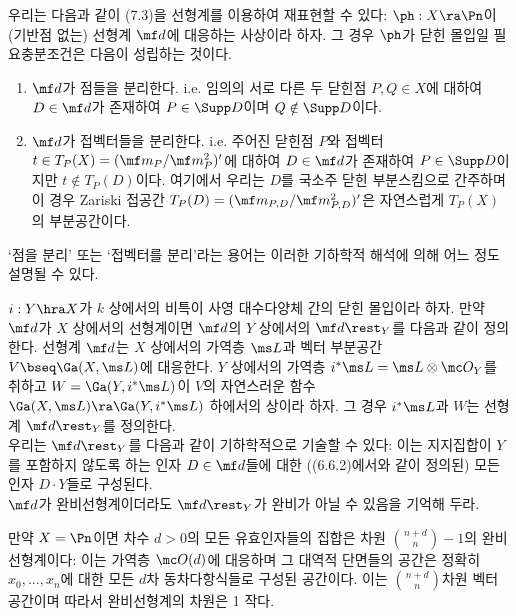 	
	\begin{remark}
	우리는 다음과 같이 (7.3)을 선형계를 이용하여 재표현할 수 있다:
	$\ph:X\ra\Pn$이 (기반점 없는) 선형계 $\mf d$에 대응하는 사상이라 하자.
	그 경우 $\ph$가 닫힌 몰입일 필요충분조건은 다음이 성립하는 것이다.
	\begin{enumerate}[label=(\arabic*)]
	\item $\mf d$가 점들을 분리한다. i.e. 임의의 서로 다른 두 닫힌점 $P,Q\in X$에 대하여
	$D\in\mf d$가 존재하여 $P\in\Supp D$이며 $Q\notin\Supp D$이다.
	\item $\mf d$가 접벡터들을 분리한다. i.e. 주어진 닫힌점 $P$와 접벡터 $t\in T_P(X)=(\mf m_P/\mf m_P^2)'$에 대하여
	$D\in\mf d$가 존재하여 $P\in\Supp D$이지만 $t\notin T_P(D)$이다. 여기에서 우리는 $D$를 국소주 닫힌 부분스킴으로 간주하며
	이 경우 Zariski 접공간 $T_P(D)=(\mf m_{P,D}/\mf m_{P,D}^2)'$은 자연스럽게 $T_P(X)$의 부분공간이다.
	\end{enumerate}
	\end{remark}
	
	`점을 분리' 또는 `접벡터를 분리'라는 용어는 이러한 기하학적 해석에 의해 어느 정도 설명될 수 있다.
	
	
	\begin{definition}
	$i:Y\hra X$가 $k$ 상에서의 비특이 사영 대수다양체 간의 닫힌 몰입이라 하자.
	만약 $\mf d$가 $X$ 상에서의 선형계이면 $\mf d$의 $Y$ 상에서의  $\mf d\rest_Y$를 다음과 같이 정의한다.
	선형계 $\mf d$는 $X$ 상에서의 가역층 $\ms L$과 벡터 부분공간 $V\bseq\Ga(X,\ms L)$에 대응한다.
	$Y$ 상에서의 가역층 $i^*\ms L=\ms L\otimes\mc O_Y$를 취하고
	$W=\Ga(Y,i^*\ms L)$이 $V$의 자연스러운 함수 $\Ga(X,\ms L)\ra\Ga(Y,i^*\ms L)$ 하에서의 상이라 하자.
	그 경우 $i^*\ms L$과 $W$는 선형계 $\mf d\rest_Y$를 정의한다.\\
	우리는 $\mf d\rest_Y$를 다음과 같이 기하학적으로 기술할 수 있다:
	이는 지지집합이 $Y$를 포함하지 않도록 하는 인자 $D\in\mf d$들에 대한
	((6.6.2)에서와 같이 정의된) 모든 인자 $D\cdot Y$들로 구성된다.\\
	$\mf d$가 완비선형계이더라도 $\mf d\rest_Y$가 완비가 아닐 수 있음을 기억해 두라.
	\end{definition}
	
	
	\begin{example}
	만약 $X=\Pn$이면 차수 $d>0$의 모든 유효인자들의 집합은 차원 $\binom{n+d}n-1$의 완비선형계이다:
	이는 가역층 $\mc O(d)$에 대응하며 그 대역적 단면들의 공간은
	정확히 $x_0,\ldots,x_n$에 대한 모든 $d$차 동차다항식들로 구성된 공간이다.
	이는 $\binom{n+d}n$차원 벡터 공간이며 따라서 완비선형계의 차원은 1 작다.
	\end{example}
	
